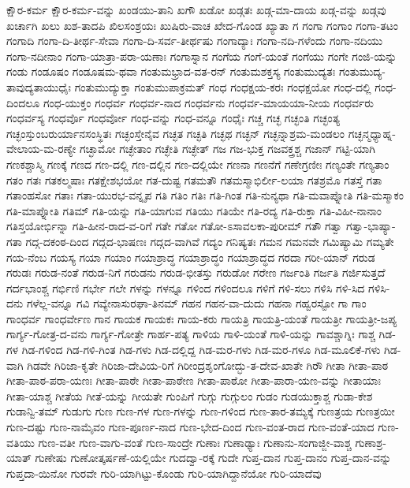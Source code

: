 {ಕ್ಷೌರ-ಕರ್ಮ
ಕ್ಷೌರ-ಕರ್ಮ-ವನ್ನು
ಖಂಡಯು-ತಾನಿ
ಖಗೌ
ಖಡೋ
ಖಡ್ಗತಃ
ಖಡ್ಗ-ಮಾ-ದಾಯ
ಖಡ್ಗ-ವನ್ನು
ಖಡ್ಗವು
ಖರ್ಚಾಗಿ
ಖಲು
ಖಶ-ತಾದಪಿ
ಖಿಲಸಂಶ್ರಯಃ
ಖುಷಿರು-ವಾಚ
ಖೇದ-ಗೊಂಡ
ಖ್ಯಾತಾ
ಗ
ಗಂಗಾ
ಗಂಗಾಂ
ಗಂಗಾ-ತಟಂ
ಗಂಗಾದಿ
ಗಂಗಾ-ದಿ-ತೀರ್ಥ-ಸೇವಾ
ಗಂಗಾ-ದಿ-ಸರ್ವ-ತೀರ್ಥಷು
ಗಂಗಾದ್ಯಾಃ
ಗಂಗಾ-ನದಿ-ಗಳೆಂದು
ಗಂಗಾ-ನದಿಯು
ಗಂಗಾ-ನದೀನಾಂ
ಗಂಗಾ-ಯಾತ್ರಾ-ಪರಾ-ಯಣಾಃ
ಗಂಗಾಸ್ನಾನ
ಗಂಗೆಯ
ಗಂಗೆ-ಯಂತೆ
ಗಂಗೆಯು
ಗಂಗೇ
ಗಂಜಿ-ಯನ್ನು
ಗಂಡು
ಗಂಡೂಷಂ
ಗಂಡೂಷಮ-ಥವಾ
ಗಂತುಮಭ್ರಾದ-ವತ-ರನ್
ಗಂತುಮಶಕ್ತಸ್ಯ
ಗಂತುಮುದ್ಯತಃ
ಗಂತುಮುದ್ಯ-ತಾವುದ್ಯತಾಯುಧೈಃ
ಗಂತುಮುದ್ಯುಕ್ತಾ
ಗಂತುಮುಪಾಕ್ರಮತ್
ಗಂಧ
ಗಂಧಕ್ಷಯ-ಕರಃ
ಗಂಧಕ್ಷಯೋ
ಗಂಧ-ದಲ್ಲಿ
ಗಂಧ-ದಿಂದಲೂ
ಗಂಧ-ಯುಕ್ತಂ
ಗಂಧರ್ವ
ಗಂಧರ್ವ-ನಾದ
ಗಂಧರ್ವನು
ಗಂಧರ್ವ-ಮಾಯಯಾ-ನೀಯ
ಗಂಧರ್ವರು
ಗಂಧರ್ವಸ್ಯ
ಗಂಧರ್ವೊ
ಗಂಧರ್ವೋ
ಗಂಧ-ವನ್ನು
ಗಂಧ-ವನ್ನೂ
ಗಂಧೈಃ
ಗಚ್ಚ
ಗಚ್ಛ
ಗಚ್ಛಂತಿ
ಗಚ್ಛಂತ್ಯ
ಗಚ್ಛಂಸ್ತುಂಬರುರ್ಯಾನಸಂಸ್ಥಿತಃ
ಗಚ್ಛಂಸ್ತೇನೈವ
ಗಚ್ಛತ
ಗಚ್ಛತಿ
ಗಚ್ಛಥ
ಗಚ್ಛನ್
ಗಚ್ಛನ್ನಾಶ್ರಮ-ಮಂಡಲಂ
ಗಚ್ಛನ್ಮಧ್ಯಾಹ್ನ-ವೇಲಾಯ-ಮ-ರಣ್ಯೇ
ಗಚ್ಛಾಮೋ
ಗಚ್ಛೇತಾಂ
ಗಚ್ಛೇತಿ
ಗಚ್ಛೇತ್
ಗಜ
ಗಜ-ಭುಕ್ತ
ಗಜವಕ್ತ್ರಶ್ಚ
ಗಜಾನ್
ಗಟ್ಟಿ-ಯಾಗಿ
ಗಣಕಶ್ಚಾಸ್ಮಿ
ಗಣಕ್ಕೆ
ಗಣದ
ಗಣ-ದಲ್ಲಿ
ಗಣ-ದಲ್ಲಿನ
ಗಣ-ದಲ್ಲಿಯೇ
ಗಣನಾ
ಗಣನೆಗೆ
ಗಣೇಗ್ರಣೀಃ
ಗಣ್ಯಂತೇ
ಗಣ್ಯತಾಂ
ಗತಂ
ಗತಃ
ಗತಕಲ್ಮಷಾಃ
ಗತಕ್ಷೇಶಭಯೋ
ಗತ-ದುಷ್ಟ
ಗತಮತೌ
ಗತಮಸ್ಮಾಭಿರ್ಲೀ-ಲಯಾ
ಗತಶ್ರಮೊ
ಗತಸ್ತೆ
ಗತಾ
ಗತಾಂಹಸೋ
ಗತಾಃ
ಗತಾ-ಯುರಭ-ವನ್ನೃಪ
ಗತಿ
ಗತಿಂ
ಗತಿಃ
ಗತಿ-ಗಿಂತ
ಗತಿ-ನುನ್ಯಥಾ
ಗತಿ-ಮವಾಪ್ನೋತಿ
ಗತಿ-ಮಸ್ಮಾಕಂ
ಗತಿ-ಮಾಪ್ನೋತಿ
ಗತಿಮ್
ಗತಿ-ಯನ್ನು
ಗತಿ-ಯಾಗುವ
ಗತಿಯು
ಗತಿಯೇ
ಗತಿ-ರದ್ಯ
ಗತಿ-ರುಕ್ತಾ
ಗತಿ-ವಿಹೀ-ನಾನಾಂ
ಗತಿಸ್ತಯೋರ್ಭಿನ್ನಾ
ಗತಿ-ಹೀನ-ರಾದ-ವ-ರಿಗೆ
ಗತೇ
ಗತೋ
ಗತೋ-ಽಸಾವಲಕಾ-ಪುರೀಮ್
ಗತೌ
ಗತ್ವಾ
ಗತ್ವಾ-ಭಾಷ್ಯಾ-ಗತಾ
ಗದ್ಗ-ದಕಂಠ-ದಿಂದ
ಗದ್ಗದ-ಭಾಷಣಃ
ಗದ್ಗದ-ವಾಗಿವೆ
ಗದ್ಯಂ
ಗನಿಷ್ಯತಃ
ಗಮನ
ಗಮನವೇ
ಗಮಿಷ್ಯಾಮಿ
ಗಮ್ಯತೇ
ಗಯ-ನೆಂಬ
ಗಯಸ್ಯ
ಗಯಾ
ಗಯಾಂ
ಗಯಾಶ್ರಾದ್ಧ
ಗಯಾಶ್ರಾದ್ಧಂ
ಗಯಾಶ್ರಾದ್ಧದ
ಗರದಾ
ಗರೀ-ಯಾನ್
ಗರುಡ
ಗರುಡಃ
ಗರುಡ-ನಂತೆ
ಗರುಡ-ನಿಗೆ
ಗರುಡನು
ಗರುಡ-ಭೀತಸ್ತು
ಗರುಡೋ
ಗರೇಣ
ಗರ್ಜಂತಿ
ಗರ್ಜತಿ
ಗರ್ಜಿಸುತ್ತದೆ
ಗರ್ದಭಾಂಶ್ಚ
ಗರ್ಭಿಣಿ
ಗರ್ಭೇ
ಗಲೇ
ಗಳನ್ನು
ಗಳನ್ನೂ
ಗಳಿಂದ
ಗಳಿಂದಲೂ
ಗಳಿಗೆ
ಗಳಿ-ಸಲು
ಗಳಿಸಿ
ಗಳಿ-ಸಿದ
ಗಳಿಸಿ-ದನು
ಗಳೆಲ್ಲ-ವನ್ನೂ
ಗವಿ
ಗವ್ಯೇನಾಸುರಘಾ-ತಿನಮ್
ಗಹನ
ಗಹನ-ವಾ-ದುದು
ಗಹನಾ
ಗಹ್ವರಸ್ಟೋ
ಗಾ
ಗಾಂ
ಗಾಂಧರ್ವ
ಗಾಂಧರ್ವೇಣ
ಗಾನ
ಗಾಯಕ
ಗಾಯಕಃ
ಗಾಯ-ಕರು
ಗಾಯತ್ರಿ
ಗಾಯತ್ರಿ-ಯಂತೆ
ಗಾಯತ್ರೀ
ಗಾಯತ್ರೀ-ಜಪ್ಯ
ಗಾರ್ಗ್ಯ-ಗೋತ್ರ-ದ-ವನು
ಗಾರ್ಗ್ಯ-ಗೋತ್ರೇ
ಗಾರ್ಹ-ಪತ್ಯ
ಗಾಳಿಯ
ಗಾಳಿ-ಯಂತೆ
ಗಾಳಿ-ಯನ್ನು
ಗಾವಶ್ಚಾಗ್ನಿಃ
ಗಾಶ್ಚ
ಗಿಡ-ಗಳ
ಗಿಡ-ಗಳಿಂದ
ಗಿಡ-ಗಳಿ-ಗಿಂತ
ಗಿಡ-ಗಳು
ಗಿಡ-ದಲ್ಲಿದ್ದ
ಗಿಡ-ಮರ-ಗಳು
ಗಿಡ-ಮರ-ಗಳೂ
ಗಿಡ-ಮೂಲಿಕೆ-ಗಳು
ಗಿಡ-ವಾಗಿ
ಗಿಡವೇ
ಗಿರಿಜಾ-ಕೃತೇ
ಗಿರಿಜಾ-ದೇವಿಯ-ರಿಗೆ
ಗಿರೀಂದ್ರಶೃಂಗೋದ್ಭು-ತ-ದೇವ-ಖಾತೇ
ಗಿರೌ
ಗೀತಾ
ಗೀತಾ-ಪಾಠ
ಗೀತಾ-ಪಾಠ-ಪರಾ-ಯಣಃ
ಗೀತಾ-ಪಾಠೇ
ಗೀತಾ-ಪಾಠೇಣ
ಗೀತಾ-ಪಾಠೋ
ಗೀತಾ-ಪಾರಾ-ಯಣ-ವನ್ನು
ಗೀತಾಯಾಃ
ಗೀತಾ-ಯಾಶ್ಚ
ಗೀತೆಯ
ಗೀತೆ-ಯನ್ನು
ಗೀಯತೇ
ಗುಂಪಿಗೆ
ಗುಗ್ಗು
ಗುಗ್ಗುಲಂ
ಗುಡಂ
ಗುಡಯುಕ್ತಾಶ್ಚ
ಗುಡಾ-ಕೇಶ
ಗುಡಾನ್ವಿ-ತಮ್
ಗುಡುಗು
ಗುಣ
ಗುಣ-ಗಳ
ಗುಣ-ಗಳನ್ನು
ಗುಣ-ಗಳಿಂದ
ಗುಣ-ತಾರ-ತಮ್ಯಕ್ಕೆ
ಗುಣತ್ರಯ
ಗುಣತ್ರಯೀ
ಗುಣ-ದಷ್ಟು
ಗುಣ-ನಾಮೈವಂ
ಗುಣ-ಪೂರ್ಣ-ನಾದ
ಗುಣ-ಭೇದ-ದಿಂದ
ಗುಣ-ವಂತ-ರಾದ
ಗುಣ-ವಂತೆ-ಯಾದ
ಗುಣ-ವತಿಯು
ಗುಣ-ವತೀ
ಗುಣ-ವಾಗು-ವಂತೆ
ಗುಣ-ಸಾಂದ್ರೇ
ಗುಣಾಃ
ಗುಣಾಢ್ಯಾಃ
ಗುಣಾನು-ಸಂಗಾಜ್ಜೀ-ವಾಶ್ಚ
ಗುಣಾಶ್ರ-ಯಾತ್
ಗುಣೇಷು
ಗುಣೋತ್ಕರ್ಷಣೆ-ಯಲ್ಲಿಯೇ
ಗುದದ್ವಾ-ರಕ್ಕೆ
ಗುದೇ
ಗುಪ್ತ-ದಾನ
ಗುಪ್ತ-ದಾನಂ
ಗುಪ್ತ-ದಾನ-ವನ್ನು
ಗುಪ್ತದಾ-ಯಿನೋ
ಗುರವೇ
ಗುರಿ-ಯಾಗಿಟ್ಟು-ಕೊಂಡು
ಗುರಿ-ಯಾಗಿದ್ದಾನೆಯೋ
ಗುರಿ-ಯಾದೆವು
}
